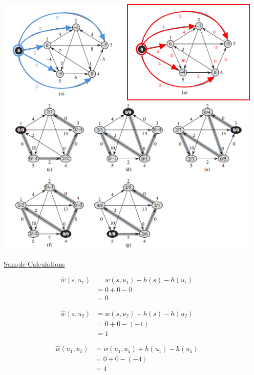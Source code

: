 \documentclass[12pt]{article}
\begin{document}
\begin{enumerate}[1.]
\begin{itemize}
\begin{enumerate}[1.]
            \begin{center}
            \includegraphics[width=\linewidth]{images/worksheet_4_solution_56.png}
            \end{center}

            \bigskip

            \underline{Sample Calculations}

            \begin{align}
            \hat{w}(s, u_1) &= w(s, u_1) + h(s) - h(u_1)\\
            &= 0 + 0 - 0\\
            &= 0
            \end{align}

            \bigskip

            \begin{align}
            \hat{w}(s, u_2) &= w(s, u_2) + h(s) - h(u_2)\\
            &= 0 + 0 - (-1)\\
            &= 1
            \end{align}

            \bigskip

            \begin{align}
            \hat{w}(u_1, u_5) &= w(u_1, u_5) + h(u_1) - h(u_5)\\
            &= 0 + 0 - (-4)\\
            &= 4
            \end{align}


\end{enumerate}
\end{itemize}
\end{enumerate}
\end{document}
